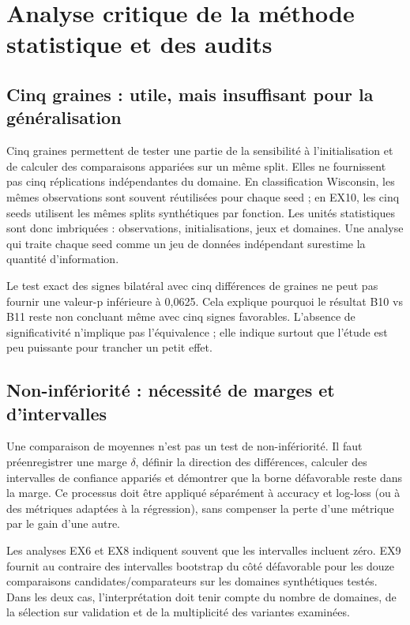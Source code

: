 \documentclass[11pt,a4paper]{article}
\begin{document}
\section{Analyse critique de la méthode statistique et des audits}

\subsection{Cinq graines : utile, mais insuffisant pour la généralisation}

Cinq graines permettent de tester une partie de la sensibilité à l'initialisation et de calculer des comparaisons appariées sur un même split. Elles ne fournissent pas cinq réplications indépendantes du domaine. En classification Wisconsin, les mêmes observations sont souvent réutilisées pour chaque seed ; en EX10, les cinq seeds utilisent les mêmes splits synthétiques par fonction. Les unités statistiques sont donc imbriquées : observations, initialisations, jeux et domaines. Une analyse qui traite chaque seed comme un jeu de données indépendant surestime la quantité d'information.

Le test exact des signes bilatéral avec cinq différences de graines ne peut pas fournir une valeur-p inférieure à 0,0625. Cela explique pourquoi le résultat B10 vs B11 reste non concluant même avec cinq signes favorables. L'absence de significativité n'implique pas l'équivalence ; elle indique surtout que l'étude est peu puissante pour trancher un petit effet.

\subsection{Non-infériorité : nécessité de marges et d'intervalles}

Une comparaison de moyennes n'est pas un test de non-infériorité. Il faut préenregistrer une marge \(\delta\), définir la direction des différences, calculer des intervalles de confiance appariés et démontrer que la borne défavorable reste dans la marge. Ce processus doit être appliqué séparément à accuracy et log-loss (ou à des métriques adaptées à la régression), sans compenser la perte d'une métrique par le gain d'une autre.

Les analyses EX6 et EX8 indiquent souvent que les intervalles incluent zéro. EX9 fournit au contraire des intervalles bootstrap du côté défavorable pour les douze comparaisons candidates/comparateurs sur les domaines synthétiques testés. Dans les deux cas, l'interprétation doit tenir compte du nombre de domaines, de la sélection sur validation et de la multiplicité des variantes examinées.
\end{document}
